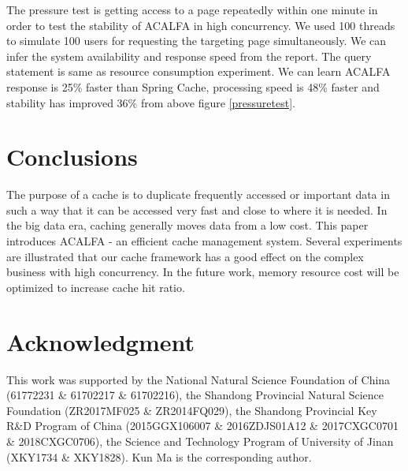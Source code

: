 \documentclass[conference]{IEEEtran}
\begin{document}
 The pressure test is getting access to a page repeatedly within one minute in order to test the stability of ACALFA in high concurrency. We used 100 threads to simulate 100 users for requesting the targeting page simultaneously. We can infer the system availability and response speed from the report. The query statement is same as resource consumption experiment. We can learn ACALFA response is 25\% faster than Spring Cache, processing speed is 48\% faster and stability has improved 36\% from above figure \ref{pressuretest}.

\section{Conclusions}
\label{Conclusions}
The purpose of a cache is to duplicate frequently accessed or important data in such a way that it can be accessed very fast and close to where it is needed. In the big data era, caching generally moves data from a low cost. This paper introduces ACALFA - an efficient cache management system. Several experiments are illustrated that our cache framework has a good effect on the complex business with high concurrency. In the future work, memory resource cost will be optimized to increase cache hit ratio.

\section*{Acknowledgment}
This work was supported by the National Natural Science Foundation of China (61772231 \& 61702217 \& 61702216), the Shandong Provincial Natural Science Foundation (ZR2017MF025 \& ZR2014FQ029), the Shandong Provincial Key R\&D Program of China (2015GGX106007 \& 2016ZDJS01A12 \& 2017CXGC0701 \& 2018CXGC0706), the Science and Technology Program of University of Jinan (XKY1734 \& XKY1828). Kun Ma is the corresponding author.



\end{document}
